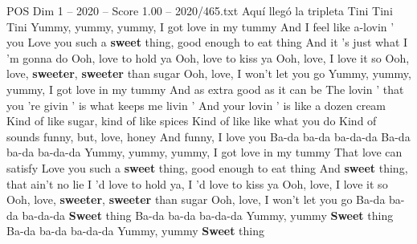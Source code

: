 \begin{textsample}{POS Dim 1 – 2020 – Score 1.00 – 2020/465.txt}  \label{ex:f1_pos_007}
Aquí llegó la tripleta Tini Tini Tini Yummy, yummy, yummy, I got love in my tummy And I feel like a-lovin ' you Love you such a \textbf{sweet} thing, good enough to eat thing And it 's just what I 'm gonna do Ooh, love to hold ya Ooh, love to kiss ya Ooh, love, I love it so Ooh, love, \textbf{sweeter}, \textbf{sweeter} than sugar Ooh, love, I won't let you go Yummy, yummy, yummy, I got love in my tummy And as extra good as it can be The lovin ' that you 're givin ' is what keeps me livin ' And your lovin ' is like a dozen cream Kind of like sugar, kind of like spices Kind of like like what you do Kind of sounds funny, but, love, honey And funny, I love you Ba-da ba-da ba-da-da Ba-da ba-da ba-da-da Yummy, yummy, yummy, I got love in my tummy That love can satisfy Love you such a \textbf{sweet} thing, good enough to eat thing And \textbf{sweet} thing, that ain't no lie I 'd love to hold ya, I 'd love to kiss ya Ooh, love, I love it so Ooh, love, \textbf{sweeter}, \textbf{sweeter} than sugar Ooh, love, I won't let you go Ba-da ba-da ba-da-da \textbf{Sweet} thing Ba-da ba-da ba-da-da Yummy, yummy \textbf{Sweet} thing Ba-da ba-da ba-da-da Yummy, yummy \textbf{Sweet} thing

\end{textsample}
